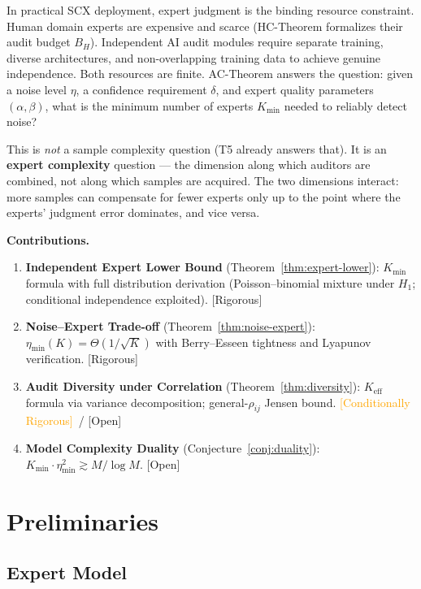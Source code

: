 \documentclass[12pt,a4paper]{article}
\newcommand{\rigorous}{\textcolor{green!50!black}{\small\textsf{[Rigorous]}}}
\newcommand{\conditionallyrigorous}{\textcolor{orange}{\small\textsf{[Conditionally Rigorous]}}}
\newcommand{\openquest}{\textcolor{red!70!black}{\small\textsf{[Open]}}}
\newcommand{\etamin}{\eta_{\min}}
\begin{document}
In practical SCX deployment, expert judgment is the binding resource constraint.
Human domain experts are expensive and scarce (HC-Theorem formalizes their audit
budget $B_H$).  Independent AI audit modules require separate training, diverse
architectures, and non-overlapping training data to achieve genuine
independence.  Both resources are finite.  AC-Theorem answers the question: given
a noise level $\eta$, a confidence requirement $\delta$, and expert quality
parameters $(\alpha,\beta)$, what is the minimum number of experts $K_{\min}$
needed to reliably detect noise?

This is \emph{not} a sample complexity question (T5 already answers that).
It is an \textbf{expert complexity} question --- the dimension along which
auditors are combined, not along which samples are acquired.  The two
dimensions interact: more samples can compensate for fewer experts only up
to the point where the experts' judgment error dominates, and vice versa.

\medskip\noindent
\textbf{Contributions.}
\begin{enumerate}[label=(\arabic*)]
    \item \textbf{Independent Expert Lower Bound}
          (Theorem~\ref{thm:expert-lower}): $K_{\min}$ formula with full
          distribution derivation (Poisson--binomial mixture under $H_1$;
          conditional independence exploited).  \rigorous
    \item \textbf{Noise--Expert Trade-off}
          (Theorem~\ref{thm:noise-expert}): $\etamin(K)=\Theta(1/\sqrt{K})$
          with Berry--Esseen tightness and Lyapunov verification.  \rigorous
    \item \textbf{Audit Diversity under Correlation}
          (Theorem~\ref{thm:diversity}): $K_{\mathrm{eff}}$ formula via
          variance decomposition; general-$\rho_{ij}$ Jensen bound.
          \conditionallyrigorous~/ \openquest
    \item \textbf{Model Complexity Duality}
          (Conjecture~\ref{conj:duality}): $K_{\min}\cdot\etamin^{2} \gtrsim M/\log M$.
          \openquest
\end{enumerate}

\section{Preliminaries}

\subsection{Expert Model}
\end{document}
